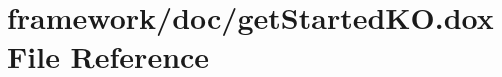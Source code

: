 \hypertarget{get_started_k_o_8dox}{}\section{framework/doc/get\+Started\+KO.dox File Reference}
\label{get_started_k_o_8dox}

